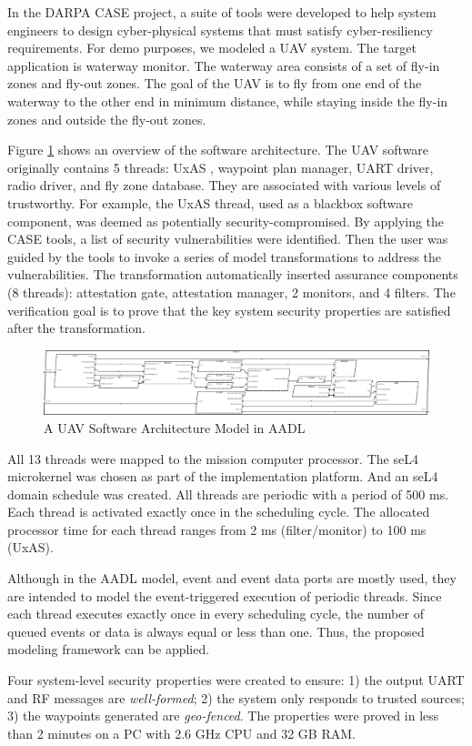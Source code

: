 In the DARPA CASE project, a suite of tools were developed to help system engineers to design cyber-physical systems that must satisfy cyber-resiliency requirements.
For demo purposes, we modeled a UAV system. The target application is waterway monitor. The waterway area consists of a set of fly-in zones and fly-out zones. The goal of the UAV is to fly from one end of the waterway to the other end in minimum distance, while staying inside the fly-in zones and outside the fly-out zones.
 
Figure \ref{SW} shows an overview of the software architecture. The UAV software originally contains 5 threads: UxAS \cite{uxas}, waypoint plan manager, UART driver, radio driver, and fly zone database. They are associated with various levels of trustworthy. For example, the UxAS thread, used as a blackbox software component, was deemed as potentially security-compromised.
By applying the CASE tools, a list of security vulnerabilities were identified. Then the user was guided by the tools to invoke a series of model transformations to address the vulnerabilities. The transformation automatically inserted assurance components (8 threads): attestation gate, attestation manager, 2 monitors, and 4 filters. The verification goal is to prove that the key system security properties are satisfied after the transformation.

\begin{figure}[ht!]
\centering
\includegraphics[width=130mm]{sw.jpg}
\caption{A UAV Software Architecture Model in AADL \label{SW}}
\end{figure}

All 13 threads were mapped to the mission computer processor. The seL4 microkernel was chosen as part of the implementation platform. And an seL4 domain schedule was created. All threads are periodic with a period of 500 ms. Each thread is activated exactly once in the scheduling cycle. The allocated processor time for each thread ranges from 2 ms (filter/monitor) to 100 ms (UxAS).

Although in the AADL model, event and event data ports are mostly used, they are intended to model the event-triggered execution of periodic threads. 
Since each thread executes exactly once in every scheduling cycle, the number of queued events or data is always equal or less than one. 
Thus, the proposed modeling framework can be applied.

Four system-level security properties were created to ensure: 1) the output UART and RF messages are \emph{well-formed}; 2) the system only responds to trusted sources; 3) the waypoints generated are \emph{geo-fenced}. The properties were proved in less than 2 minutes on a PC with 2.6 GHz CPU and 32 GB RAM.

